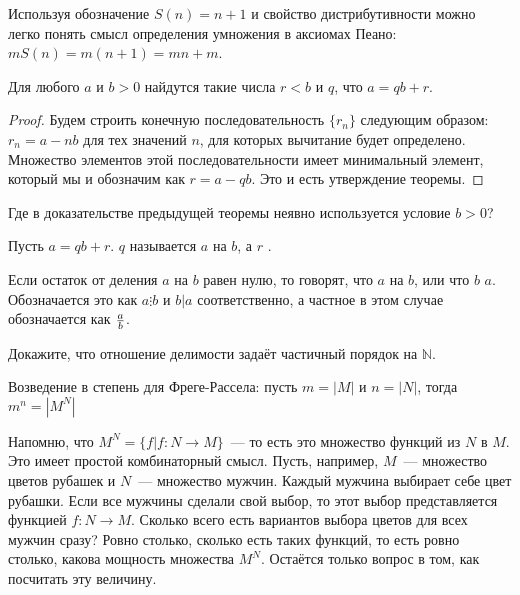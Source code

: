 Используя обозначение $S(n) = n+1$ и свойство дистрибутивности можно легко понять смысл определения умножения в аксиомах Пеано: $mS(n) = m(n+1) = mn + m$.

\begin{thm}
Для любого $a$ и $b > 0$ найдутся такие числа $r<b$ и $q$, что $a = qb + r$.
\end{thm}
\begin{proof}
Будем строить конечную последовательность $\{r_n\}$ следующим образом: $r_n = a - nb$ для тех значений $n$, для которых вычитание будет определено. Множество элементов этой последовательности имеет минимальный элемент, который мы и обозначим как $r = a - qb$. Это и есть утверждение теоремы.
\end{proof}

\begin{exercise}
Где в доказательстве предыдущей теоремы неявно используется условие $b>0$?
\end{exercise}

\begin{definition}
Пусть $a = qb + r$. $q$ называется  $a$ на $b$, а $r$ .
\end{definition}

\begin{definition}
Если остаток от деления $a$ на $b$ равен нулю, то говорят, что $a$  на $b$, или что $b$  $a$. Обозначается это как $a\vdots b$ и  $b|a$ соответственно, а частное в этом случае обозначается как $a\over b$.
\end{definition}

\begin{exercise}
Докажите, что отношение делимости задаёт частичный порядок на $\mathbb{N}$.
\end{exercise}

\begin{definition}
Возведение в степень для Фреге-Рассела: пусть $m = |M|$ и $n = |N|$, тогда $m^n = |M^N|$
\end{definition}

Напомню, что $M^N = \{f|f:N\to M\}$~--- то есть это множество функций из $N$ в $M$. Это имеет простой комбинаторный смысл. Пусть, например, $M$~--- множество цветов рубашек и $N$~--- множество мужчин. Каждый мужчина выбирает себе цвет рубашки. Если все мужчины сделали свой выбор, то этот выбор представляется функцией $f: N \to M$. Сколько всего есть вариантов выбора цветов для всех мужчин сразу? Ровно столько, сколько есть таких функций, то есть ровно столько, какова мощность множества $M^N$. Остаётся только вопрос в том, как посчитать эту величину.

